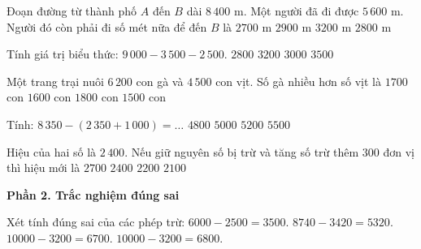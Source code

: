 \begin{ex} %
Đoạn đường từ thành phố $A$ đến $B$ dài $8\,400\text{ m}$. Một người đã đi được $5\,600\text{ m}$. Người đó còn phải đi số mét nữa để đến $B$ là
\choice
{$2700\text{ m}$}
{$2900\text{ m}$}
{$3200\text{ m}$}
{\True $2800\text{ m}$}
\end{ex}

\begin{ex} %
Tính giá trị biểu thức: $9\,000 - 3\,500 - 2\,500$.
\choice
{$2800$}
{$3200$}
{\True $3000$}
{$3500$}
\end{ex}

\begin{ex} %
Một trang trại nuôi $6\,200$ con gà và $4\,500$ con vịt. Số gà nhiều hơn số vịt là
\choice
{\True $1700$ con}
{$1600$ con}
{$1800$ con}
{$1500$ con}
\end{ex}

\begin{ex} %
Tính: $8\,350 - (2\,350 + 1\,000) = \dots$
\choice
{$4800$}
{\True $5000$}
{$5200$}
{$5500$}
\end{ex}

\begin{ex} %
Hiệu của hai số là $2\,400$. Nếu giữ nguyên số bị trừ và tăng số trừ thêm $300$ đơn vị thì hiệu mới là
\choice
{$2700$}
{$2400$}
{$2200$}
{\True $2100$}
\end{ex}

\textbf{Phần 2. Trắc nghiệm đúng sai}

\begin{ex} %
Xét tính đúng sai của các phép trừ:
\choiceTF
{\True $6000 - 2500 = 3500$.}
{\True $8740 - 3420 = 5320$.}
{$10000 - 3200 = 6700$.}
{\True $10000 - 3200 = 6800$.}
\end{ex}


